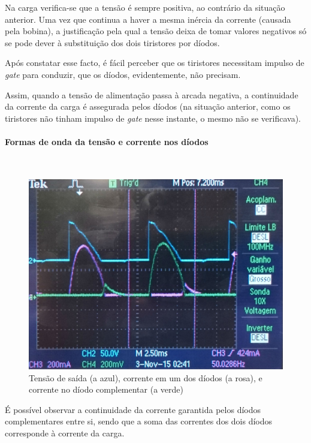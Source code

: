 \documentclass[a4paper,11pt]{article}
\numberwithin{equation}{section}
\begin{document}
Na carga verifica-se que a tensão é sempre positiva, ao contrário da situação anterior. Uma vez que continua a haver a mesma inércia da corrente (causada pela bobina), a justificação pela qual a tensão deixa de tomar valores negativos só se pode dever à substituição dos dois tiristores por díodos.

Após constatar esse facto, é fácil perceber que os tiristores necessitam impulso de \textit{gate} para conduzir, que os díodos, evidentemente, não precisam.

Assim, quando a tensão de alimentação passa à arcada negativa, a continuidade da corrente da carga é assegurada pelos díodos (na situação anterior, como os tiristores não tinham impulso de \textit{gate} nesse instante, o mesmo não se verificava).

\paragraph{Formas de onda da tensão e corrente nos díodos} \mbox{}\

\begin{figure}[H]
	\centering
	\includegraphics[keepaspectratio=true, scale=0.12]{img/DSC_0189}
	\caption{Tensão de saída (a azul), corrente em um dos díodos (a rosa), e corrente no díodo complementar (a verde)}
	\label{fig:rsemidiodos}
	\vspace{-0.8em}
\end{figure}

É possível observar a continuidade da corrente garantida pelos díodos complementares entre si, sendo que a soma das correntes dos dois díodos corresponde à corrente da carga.
\end{document}
